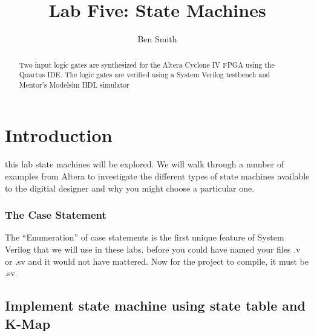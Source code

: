 
\newcommand{\TITLE}{Lab Five: State Machines}
\newcommand{\KEYWORDS}{Logic Gates, Verilog, FPGA, Signaltap, Synthesis}
\title{Lab Five: State Machines}
\author{Ben Smith}




  \maketitle
    \begin{abstract}
      Two input logic gates are synthesized for the Altera Cyclone IV FPGA using the Quartus IDE. The logic gates are verified using a System Verilog testbench and Mentor's Modelsim HDL simulator
    \end{abstract}
\section{ Introduction}
   this lab state machines will be explored. We will walk through a number of examples from Altera to investigate the different types of state machines available to the digitial designer and why you might choose a particular one.

    \subsubsection{The Case Statement}
     The ``Enumeration'' of case statements is the first unique feature of System Verilog that we will use in these labs. before you could have named your files .v or .sv and it would not have mattered. Now for the project to compile, it must be .sv.

  \subsection{Implement state machine using state table and K-Map}

